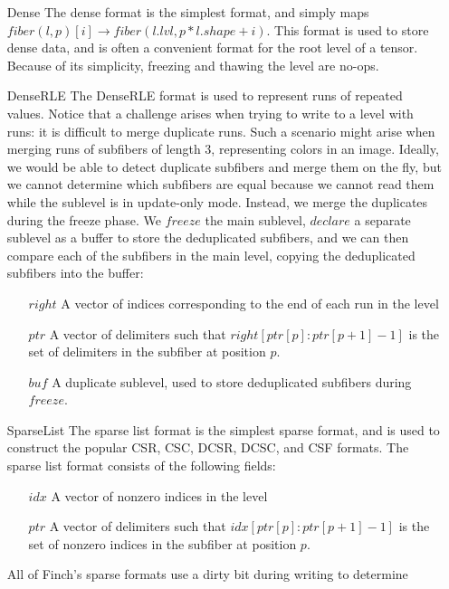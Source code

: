 \begin{enumerate}
\item[Dense]
    The dense format is the simplest format, and simply maps $fiber(l, p)[i]
    \rightarrow fiber(l.lvl, p * l.shape + i)$. This format is used to store dense data,
    and is often a convenient format for the root level of a tensor. Because
    of its simplicity, freezing and thawing the level are no-ops.
\item[DenseRLE]
    The DenseRLE format is used to represent runs of repeated values. Notice
    that a challenge arises when trying to write to a level with runs: it is
    difficult to merge duplicate runs. Such a scenario might arise when merging
    runs of subfibers of length 3, representing colors in an image.  Ideally, we
    would be able to detect duplicate subfibers and merge them on the fly, but
    we cannot determine which subfibers are equal because we cannot read them
    while the sublevel is in update-only mode. Instead, we merge the duplicates
    during the freeze phase. We $freeze$ the main sublevel, $declare$ a separate
    sublevel as a buffer to store the deduplicated subfibers, and we can then
    compare each of the subfibers in the main level, copying the deduplicated
    subfibers into the buffer:
    \begin{enumerate}
        \item[$right$] A vector of indices corresponding to the end of each run in the level
        \item[$ptr$] A vector of delimiters such that $right[ptr[p]:ptr[p+1] - 1]$ is the set of delimiters in the subfiber at position $p$.
        \item[$buf$] A duplicate sublevel, used to store deduplicated subfibers during $freeze$.
    \end{enumerate}
\item[SparseList]
    The sparse list format is the simplest sparse format, and is used to
    construct the popular CSR, CSC, DCSR, DCSC, and CSF formats. The sparse list
    format consists of the following fields:
    \begin{enumerate}
        \item[$idx$] A vector of nonzero indices in the level
        \item[$ptr$] A vector of delimiters such that $idx[ptr[p]:ptr[p+1] - 1]$ is the set of nonzero indices in the subfiber at position $p$.
    \end{enumerate}
    All of Finch's sparse formats use a dirty bit during writing to determine

\end{enumerate}
